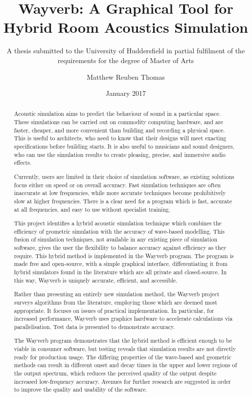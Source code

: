\documentclass[]{scrreprt}
\title{Wayverb: A Graphical Tool for Hybrid Room Acoustics Simulation}
\subtitle{A thesis submitted to the University of Huddersfield in partial
fulfilment of the requirements for the degree of Master of Arts}
\author{Matthew Reuben Thomas}
\date{January 2017}
\begin{document}
\maketitle
\begin{abstract}
Acoustic simulation aims to predict the behaviour of sound in a
particular space. These simulations can be carried out on commodity
computing hardware, and are faster, cheaper, and more convenient than
building and recording a physical space. This is useful to architects,
who need to know that their designs will meet exacting specifications
before building starts. It is also useful to musicians and sound
designers, who can use the simulation results to create pleasing,
precise, and immersive audio effects.

Currently, users are limited in their choice of simulation software, as
existing solutions focus either on speed or on overall accuracy. Fast
simulation techniques are often inaccurate at low frequencies, while
more accurate techniques become prohibitively slow at higher
frequencies. There is a clear need for a program which is fast, accurate
at all frequencies, and easy to use without specialist training.

This project identifies a hybrid acoustic simulation technique which
combines the efficiency of geometric simulation with the accuracy of
wave-based modelling. This fusion of simulation techniques, not
available in any existing piece of simulation software, gives the user
the flexibility to balance accuracy against efficiency as they require.
This hybrid method is implemented in the Wayverb program. The program is
made free and open-source, with a simple graphical interface,
differentiating it from hybrid simulators found in the literature which
are all private and closed-source. In this way, Wayverb is uniquely
accurate, efficient, and accessible.

Rather than presenting an entirely new simulation method, the Wayverb
project surveys algorithms from the literature, employing those which
are deemed most appropriate. It focuses on issues of practical
implementation. In particular, for increased performance, Wayverb uses
graphics hardware to accelerate calculations via parallelisation. Test
data is presented to demonstrate accuracy.

The Wayverb program demonstrates that the hybrid method is efficient
enough to be viable in consumer software, but testing reveals that
simulation results are not directly ready for production usage. The
differing properties of the wave-based and geometric methods can result
in different onset and decay times in the upper and lower regions of the
output spectrum, which reduces the perceived quality of the output
despite increased low-frequency accuracy. Avenues for further research
are suggested in order to improve the quality and usability of the
software.
\end{abstract}
\end{document}
